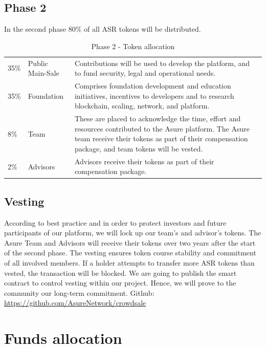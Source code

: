 \newpage
\subsection{Phase 2}

In the second phase 80\% of all ASR tokens will be distributed.

\begin{table}[H]
\begin{tabular}{llp{}l}
  35\% & Public Main-Sale & Contributions will be used to develop the platform, and to fund security, legal and operational needs. \\
  35\% & Foundation & Comprises foundation development and education initiatives, incentives to developers and to research blockchain, scaling, network, and platform.\\
  8\% & Team  & These are placed to acknowledge the time, effort and resources contributed to the Asure platform.  The Asure team receive their tokens as part of their compensation package, and team tokens will be vested.\\
  2\% & Advisors & Advisors receive their tokens as part of their compensation package.
\end{tabular}
\caption{\label{tab:table-name} Phase 2 - Token allocation}
\end{table}

\subsection{Vesting}
According to best practice and in order to protect investors and future participants of our platform, we will lock up our team’s and advisor's tokens. The Asure Team and Advisors will receive their tokens over two years after the start of the second phase.
The vesting ensures token course stability and commitment of all involved members. If a holder attempts to transfer more ASR tokens than vested, the transaction will be blocked.
We are going to publish the smart contract to control vesting within our project. Hence, we will prove to the community our long-term commitment.
\newline\newline
Github: \url{https://github.com/AsureNetwork/crowdsale}

\newpage
\section{Funds allocation}

